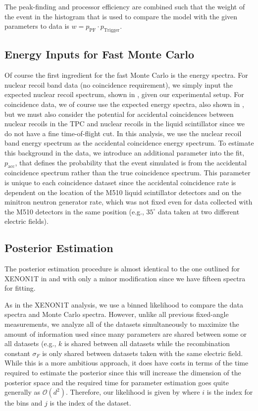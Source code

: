 The peak-finding and processor efficiency are combined such that the weight of the event in the histogram that is used to compare the model with the given parameters to data is $w = p_{\textrm{PF}} \cdot p_{\textrm{Trigger}}$.



\subsection{Energy Inputs for Fast Monte Carlo}


Of course the first ingredient for the fast Monte Carlo is the energy spectra.  For nuclear recoil band data (no coincidence requirement), we simply input the expected nuclear recoil spectrum, shown in , given our experimental setup.  For coincidence data, we of course use the expected energy spectra, also shown in , but we must also consider the potential for accidental coincidences between nuclear recoils in the TPC and nuclear recoils in the liquid scintillator since we do not have a fine time-of-flight cut.  In this analysis, we use the nuclear recoil band energy spectrum as the accidental coincidence energy spectrum.  To estimate this background in the data, we introduce an additional parameter into the fit, $p_{\textrm{acc}}$, that defines the probability that the event simulated is from the accidental coincidence spectrum rather than the true coincidence spectrum.  This parameter is unique to each coincidence dataset since the accidental coincidence rate is dependent on the location of the M510 liquid scintillator detectors and on the minitron neutron generator rate, which was not fixed even for data collected with the M510 detectors in the same position (e.g., $35^{\circ}$ data taken at two different electric fields).



\subsection{Posterior Estimation}


The posterior estimation procedure is almost identical to the one outlined for XENON1T in  and  with only a minor modification since we have fifteen spectra for fitting.  

As in the XENON1T analysis, we use a binned likelihood to compare the data spectra and Monte Carlo spectra.  However, unlike all previous fixed-angle measurements, we analyze all of the datasets simultaneously to maximize the amount of information used since many parameters are shared between some or all datasets (e.g., $k$ is shared between all datasets while the recombination constant $\sigma_F$ is only shared between datasets taken with the same electric field.  While this is a more ambitious approach, it does have costs in terms of the time required to estimate the posterior since this will increase the dimension of the posterior space and the required time for parameter estimation goes quite generally as $\mathcal{O}(d^2)$.  Therefore, our likelihood is given by  where $i$ is the index for the bins and $j$ is the index of the dataset.


